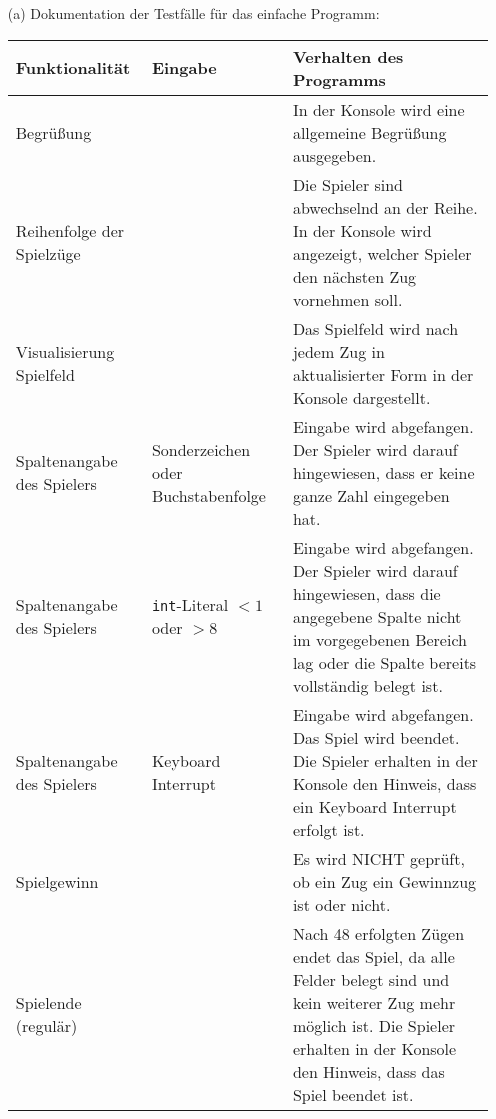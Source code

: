\documentclass[a4paper]{article}
\begin{document}
\begin{exercise}{2}

\begin{itemize}

\item[(a)] Dokumentation der Testf\"alle f\"ur das einfache Programm:


\begin{center}
\begin{tabular}{| p{2.5cm} | p{2.2cm} | p{10cm} |}
		\hline
		Funktionalit\"at & Eingabe & Verhalten des Programms\\ \hline \hline
		
		Begr\"u\ss{}ung & 
		& In der Konsole wird eine allgemeine Begr\"u\ss{}ung ausgegeben. \\ \hline
		
		Reihenfolge der Spielz\"uge & 
		& Die Spieler sind abwechselnd an der Reihe. In der Konsole wird
		angezeigt, welcher Spieler den n\"achsten Zug vornehmen soll.\\ \hline
		
		Visualisierung Spielfeld & 
		& Das Spielfeld wird nach jedem Zug in aktualisierter Form in der Konsole dargestellt. \\ \hline
		
		Spaltenangabe des Spielers & Sonderzeichen \newline oder Buchstabenfolge 
		& Eingabe wird abgefangen. Der Spieler wird darauf hingewiesen,
		dass er keine ganze Zahl eingegeben hat.\\ \hline
		
		Spaltenangabe des Spielers & \texttt{int}-Literal \newline $< 1$ oder $> 8$
		& Eingabe wird abgefangen. Der Spieler wird darauf hingewiesen,
		dass die angegebene Spalte nicht im vorgegebenen Bereich lag oder die Spalte bereits vollst\"andig belegt ist. \\ \hline
		
		Spaltenangabe des Spielers & Keyboard \newline Interrupt
		& Eingabe wird abgefangen. Das Spiel wird beendet. Die Spieler erhalten in der Konsole den Hinweis, dass ein
		Keyboard Interrupt erfolgt ist.\\ \hline
		
		Spielgewinn &
		& Es wird NICHT gepr\"uft, ob ein Zug ein Gewinnzug ist oder nicht. \\ \hline
		
		Spielende \newline (regul\"ar) &
		& Nach 48 erfolgten Z\"ugen endet das Spiel, da alle Felder belegt sind und kein weiterer Zug mehr m\"oglich ist.
		Die Spieler erhalten in der Konsole den Hinweis, dass das Spiel beendet ist. \\ \hline
		\end{tabular}
\end{center}



\end{itemize}
\end{exercise}
\end{document}
